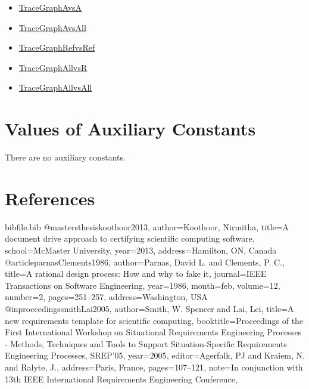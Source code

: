 \documentclass[12pt]{article}
\begin{document}
\begin{itemize}
\item{\hyperref{../../../../traceygraphs/bmbnd/avsa.svg}{}{}{TraceGraphAvsA}}
\item{\hyperref{../../../../traceygraphs/bmbnd/avsall.svg}{}{}{TraceGraphAvsAll}}
\item{\hyperref{../../../../traceygraphs/bmbnd/refvsref.svg}{}{}{TraceGraphRefvsRef}}
\item{\hyperref{../../../../traceygraphs/bmbnd/allvsr.svg}{}{}{TraceGraphAllvsR}}
\item{\hyperref{../../../../traceygraphs/bmbnd/allvsall.svg}{}{}{TraceGraphAllvsAll}}
\end{itemize}
\section{Values of Auxiliary Constants}
\label{Sec:AuxConstants}
There are no auxiliary constants.

\section{References}
\label{Sec:References}
\begin{filecontents*}{bibfile.bib}
@mastersthesis{koothoor2013,
author={Koothoor, Nirmitha},
title={A document drive approach to certifying scientific computing software},
school={McMaster University},
year={2013},
address={Hamilton, ON, Canada}}
@article{parnasClements1986,
author={Parnas, David L. and Clements, P. C.},
title={A rational design process: How and why to fake it},
journal={IEEE Transactions on Software Engineering},
year={1986},
month=feb,
volume={12},
number={2},
pages={251--257},
address={Washington, USA}}
@inproceedings{smithLai2005,
author={Smith, W. Spencer and Lai, Lei},
title={A new requirements template for scientific computing},
booktitle={Proceedings of the First International Workshop on Situational Requirements Engineering Processes - Methods, Techniques and Tools to Support Situation-Specific Requirements Engineering Processes, SREP'05},
year={2005},
editor={Agerfalk, PJ and Kraiem, N. and Ralyte, J.},
address={Paris, France},
pages={107--121},
note={In conjunction with 13th IEEE International Requirements Engineering Conference,}}
\end{filecontents*}
\nocite{*}
\printbibliography[heading=none]
\end{document}
